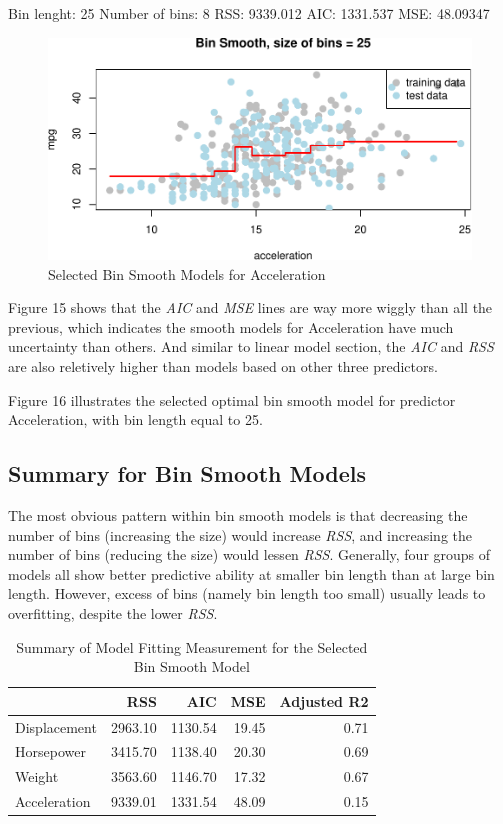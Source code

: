 \documentclass[]{article}
\begin{document}
Bin lenght: 25 Number of bins: 8 RSS: 9339.012 AIC: 1331.537 MSE:
48.09347

\begin{figure}

{\centering \includegraphics{Report_files/figure-latex/bin-a-best-1} 

}

\caption{Selected Bin Smooth Models for Acceleration}\label{fig:bin-a-best}
\end{figure}

Figure 15 shows that the \emph{AIC} and \emph{MSE} lines are way more
wiggly than all the previous, which indicates the smooth models for
Acceleration have much uncertainty than others. And similar to linear
model section, the \emph{AIC} and \emph{RSS} are also reletively higher
than models based on other three predictors.

Figure 16 illustrates the selected optimal bin smooth model for
predictor Acceleration, with bin length equal to 25.

\hypertarget{summary-for-bin-smooth-models}{%
\subsection{Summary for Bin Smooth
Models}\label{summary-for-bin-smooth-models}}

The most obvious pattern within bin smooth models is that decreasing the
number of bins (increasing the size) would increase \emph{RSS}, and
increasing the number of bins (reducing the size) would lessen
\emph{RSS}. Generally, four groups of models all show better predictive
ability at smaller bin length than at large bin length. However, excess
of bins (namely bin length too small) usually leads to overfitting,
despite the lower \emph{RSS}.

\begin{longtable}[t]{lrrrr}
\caption{\label{tab:bin-sum}Summary of Model Fitting Measurement for the Selected Bin Smooth Model}\\
\toprule
  & RSS & AIC & MSE & Adjusted R2\\
\midrule
Displacement & 2963.10 & 1130.54 & 19.45 & 0.71\\
Horsepower & 3415.70 & 1138.40 & 20.30 & 0.69\\
Weight & 3563.60 & 1146.70 & 17.32 & 0.67\\
Acceleration & 9339.01 & 1331.54 & 48.09 & 0.15\\
\bottomrule
\end{longtable}
\end{document}
